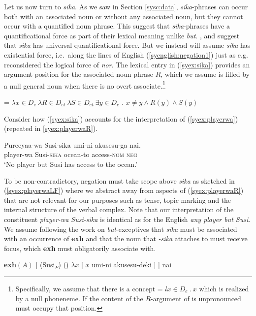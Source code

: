 \documentclass[output=paper,colorlinks,citecolor=brown,
]{langscibook}
\let\l\lambda
\def\M#1{\textsc{#1}}
\begin{document}
Let us now turn to \emph{sika}.  As we saw in Section \ref{sysc:data}, \emph{sika}-phrases can occur both with an associated noun or without any associated noun, but they cannot occur with a quantified noun phrase.
This suggest that \emph{sika}-phrases have a quantificational force as part of their lexical meaning unlike \emph{but}.
\cite{alonso-ovalle04a}, \cite{kawahara08a} and \cite{yoshimura2007b} suggest that \emph{sika} has universal quantificational force.
But we instead will assume \emph{sika} has existential force, i.e.\ along the lines of English (\ref{syenglish:negation1}) just as e.g.\ \cite{wurmbrand08b} reconsidered the logical force of \emph{nor}.
The lexical entry in (\ref{syex:sika}) provides an argument position for the associated noun phrase $R$, which we assume is filled by a null general noun when there is no overt associate.\footnote{Specifically, we assume that there is a concept  = $l x \in D_e\ .\ x$ which is realized by a null phoneneme.  If the content of the $R$-argument of  is unpronounced  must occupy that position.}

\ea \label{syex:sika} 
    = $\l x \in D_e\ \l R \in D_{et}\ \l S \in D_{et}\ \exists y \in D_e$ . $x \neq y \land R(y) \land S(y)$\z

Consider how (\ref{syex:sika}) accounts for the interpretation of (\ref{syex:playerwa}) (repeated in \ref{syex:playerwaR}).

\ea \label{syex:playerwaR}
\gll Pureeyaa-wa Susi-sika umi-ni akusesu-ga nai.\\
player-wa Susi-\M{sika} ocean-{to} access-\M{nom} \M{neg}\\
\glt `No player but Susi  has access to the ocean.'\z

To be non-contradictory, negation must take scope above \emph{sika} as sketched in (\ref{syex:playerwaLF}) where we abstract away from  aspects of (\ref{syex:playerwaR}) that are not relevant for our purposes such as tense,  topic marking and the internal structure of the verbal complex.
Note that our interpretation of the constituent \emph{player-wa Susi-sika} is identical as for the English \emph{any player but Susi}.
We assume following the work on \emph{but}-exceptives that \emph{sika} must be associated with an occurrence of \textbf{exh} and that the noun that \emph{-sika} attaches to must receive focus, which \textbf{exh} must obligatorily associate with.

\ea \label{syex:playerwaLF}
    \textbf{exh}$(A)$ [   (Susi$_F$) () $\lambda x$ [ $x$ umi-ni akusesu-deki ] ] nai \z
\end{document}
